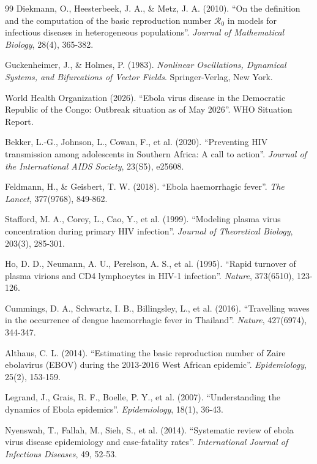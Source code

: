 ﻿\documentclass[a4paper,12pt]{article}
\theoremstyle{definition}
\begin{document}
\begin{thebibliography}{99}
Diekmann, O., Heesterbeek, J. A., \& Metz, J. A. (2010).
``On the definition and the computation of the basic reproduction number $\mathcal{R}_0$ in models for infectious diseases in heterogeneous populations''.
\textit{Journal of Mathematical Biology}, 28(4), 365-382.

Guckenheimer, J., \& Holmes, P. (1983).
\textit{Nonlinear Oscillations, Dynamical Systems, and Bifurcations of Vector Fields}.
Springer-Verlag, New York.

World Health Organization (2026).
``Ebola virus disease in the Democratic Republic of the Congo: Outbreak situation as of May 2026''.
WHO Situation Report.

Bekker, L.-G., Johnson, L., Cowan, F., et al. (2020).
``Preventing HIV transmission among adolescents in Southern Africa: A call to action''.
\textit{Journal of the International AIDS Society}, 23(S5), e25608.

Feldmann, H., \& Geisbert, T. W. (2018).
``Ebola haemorrhagic fever''.
\textit{The Lancet}, 377(9768), 849-862.

Stafford, M. A., Corey, L., Cao, Y., et al. (1999).
``Modeling plasma virus concentration during primary HIV infection''.
\textit{Journal of Theoretical Biology}, 203(3), 285-301.

Ho, D. D., Neumann, A. U., Perelson, A. S., et al. (1995).
``Rapid turnover of plasma virions and CD4 lymphocytes in HIV-1 infection''.
\textit{Nature}, 373(6510), 123-126.

Cummings, D. A., Schwartz, I. B., Billingsley, L., et al. (2016).
``Travelling waves in the occurrence of dengue haemorrhagic fever in Thailand''.
\textit{Nature}, 427(6974), 344-347.

Althaus, C. L. (2014).
``Estimating the basic reproduction number of Zaire ebolavirus (EBOV) during the 2013-2016 West African epidemic''.
\textit{Epidemiology}, 25(2), 153-159.

Legrand, J., Grais, R. F., Boelle, P. Y., et al. (2007).
``Understanding the dynamics of Ebola epidemics''.
\textit{Epidemiology}, 18(1), 36-43.

Nyenswah, T., Fallah, M., Sieh, S., et al. (2014).
``Systematic review of ebola virus disease epidemiology and case-fatality rates''.
\textit{International Journal of Infectious Diseases}, 49, 52-53.


\end{thebibliography}
\end{document}
